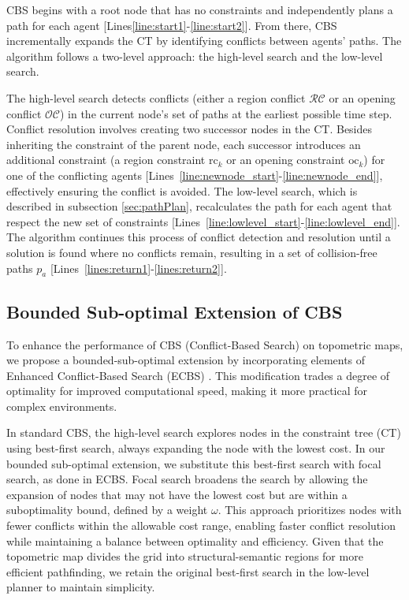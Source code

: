 \documentclass[letterpaper, 10 pt, conference]{ieeeconf}  %
\begin{document}
CBS begins with a root node that has no constraints and independently plans a path for each agent [Lines\ref{line:start1}-\ref{line:start2}]. From there, CBS incrementally expands the CT by identifying conflicts between agents' paths. The algorithm follows a two-level approach: the high-level search and the low-level search.

The high-level search detects conflicts (either a region conflict $\mathcal{RC}$ or an opening conflict $\mathcal{OC}$) in the current node’s set of paths at the earliest possible time step. Conflict resolution involves creating two successor nodes in the CT. Besides inheriting the constraint of the parent node, each successor introduces an additional constraint (a region constraint $\mathrm{rc}_k$ or an opening constraint $\mathrm{oc}_k$) for one of the conflicting agents [Lines~\ref{line:newnode_start}-\ref{line:newnode_end}], effectively ensuring the conflict is avoided. The low-level search, which is described in subsection \ref{sec:pathPlan}, recalculates the path for each agent that respect the new set of constraints [Lines~\ref{line:lowlevel_start}-\ref{line:lowlevel_end}]. The algorithm continues this process of conflict detection and resolution until a solution is found where no conflicts remain, resulting in a set of collision-free paths $p_a$ [Lines~\ref{lines:return1}-\ref{lines:return2}].

\subsection{Bounded Sub-optimal Extension of CBS} \label{subsec:ECBS}
To enhance the performance of CBS (Conflict-Based Search) on topometric maps, we propose a bounded-sub-optimal extension by incorporating elements of Enhanced Conflict-Based Search (ECBS) \cite{barer2014suboptimal}. This modification trades a degree of optimality for improved computational speed, making it more practical for complex environments.

In standard CBS, the high-level search explores nodes in the constraint tree (CT) using best-first search, always expanding the node with the lowest cost. In our bounded sub-optimal extension, we substitute this best-first search with focal search, as done in ECBS. Focal search broadens the search by allowing the expansion of nodes that may not have the lowest cost but are within a suboptimality bound, defined by a weight $\omega$. This approach prioritizes nodes with fewer conflicts within the allowable cost range, enabling faster conflict resolution while maintaining a balance between optimality and efficiency.
%
Given that the topometric map divides the grid into structural-semantic regions for more efficient pathfinding, we retain the original best-first search in the low-level planner to maintain simplicity.
\end{document}
